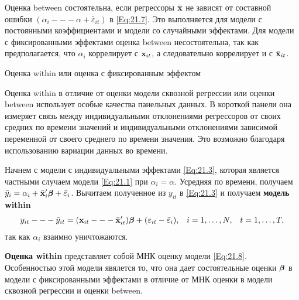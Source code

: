 Оценка between состоятельна, если регрессоры $\bar{\mathbf{x}}$ не зависят от составной ошибки  $(\alpha_i --- \alpha + \bar{\varepsilon}_{it})$ в \ref{Eq:21.7}. Это выполняется для модели с постоянными коэффициентами и модели со случайными эффектами. Для модели с фиксированными эффектами оценка between несостоятельна, так как предполагается, что $\alpha_i$ коррелирует с $\mathbf{x}_{it}$, а следовательно коррелирует и с $\bar{\mathbf{x}}_{it}$.

{\centering 
Оценка within или оценка с фиксированным эффектом\\}

Оценка within в отличие от оценки модели сквозной регрессии или оценки between использует особые качества панельных данных. В короткой панели она измеряет связь между индивидуальными отклонениями регрессоров от своих средних по времени значений и индивидуальными отклонениями зависимой переменной от своего среднего по времени значения. Это возможно благодаря использованию вариации данных во времени.

Начнем с модели с индивидуальными эффектами \ref{Eq:21.3}, которая является частными случаем модели \ref{Eq:21.1} при $\alpha_i=\alpha$. Усредняя по времени, получаем $\bar{y}_i=\alpha_i+\bar{\mathbf{x}}'_{i} \bm{\beta}+\bar{\varepsilon}_i$. Вычитаем полученное из $y_{it}$ в  \ref{Eq:21.3} и получаем \textbf{модель within}
\begin{align}
& y_{it} --- \bar{y}_{it} = (\mathbf{x}_{it} --- \bar{\mathbf x}'_{it}) \bm{\beta} + (\varepsilon_{it}-\bar{\varepsilon}_i),
& i=1, \dots, N, &
& t=1, \dots, T,
\label{Eq:21.8}
\end{align}
так как $\alpha_i$ взаимно уничтожаются.

\textbf{Оценка within} представляет собой МНК оценку модели \ref{Eq:21.8}. Особенностью этой модели явялется то, что она дает состоятельные оценки $\bm{\beta}$ в модели с фиксированными эффектами в отличие от МНК оценки в модели сквозной регрессии и оценки between.

